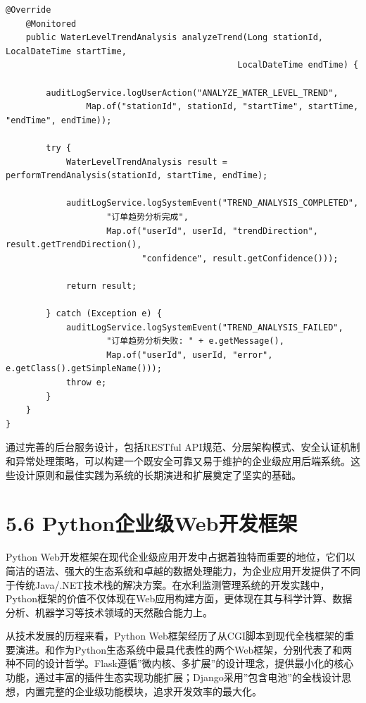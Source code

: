 \begin{lstlisting}[style=java]
    @Override
    @Monitored
    public WaterLevelTrendAnalysis analyzeTrend(Long stationId, LocalDateTime startTime, 
                                              LocalDateTime endTime) {
        
        auditLogService.logUserAction("ANALYZE_WATER_LEVEL_TREND", 
                Map.of("stationId", stationId, "startTime", startTime, "endTime", endTime));
        
        try {
            WaterLevelTrendAnalysis result = performTrendAnalysis(stationId, startTime, endTime);
            
            auditLogService.logSystemEvent("TREND_ANALYSIS_COMPLETED", 
                    "订单趋势分析完成", 
                    Map.of("userId", userId, "trendDirection", result.getTrendDirection(),
                           "confidence", result.getConfidence()));
            
            return result;
            
        } catch (Exception e) {
            auditLogService.logSystemEvent("TREND_ANALYSIS_FAILED", 
                    "订单趋势分析失败: " + e.getMessage(),
                    Map.of("userId", userId, "error", e.getClass().getSimpleName()));
            throw e;
        }
    }
}
\end{lstlisting}

通过完善的后台服务设计，包括RESTful API规范、分层架构模式、安全认证机制和异常处理策略，可以构建一个既安全可靠又易于维护的企业级应用后端系统。这些设计原则和最佳实践为系统的长期演进和扩展奠定了坚实的基础。

\hypertarget{pythonux4f01ux4e1aux7ea7webux5f00ux53d1ux6846ux67b6}{%
\section{5.6 Python企业级Web开发框架}\label{pythonux4f01ux4e1aux7ea7webux5f00ux53d1ux6846ux67b6}}

Python Web开发框架在现代企业级应用开发中占据着独特而重要的地位，它们以简洁的语法、强大的生态系统和卓越的数据处理能力，为企业应用开发提供了不同于传统Java/.NET技术栈的解决方案。在水利监测管理系统的开发实践中，Python框架的价值不仅体现在Web应用构建方面，更体现在其与科学计算、数据分析、机器学习等技术领域的天然融合能力上。

从技术发展的历程来看，Python Web框架经历了从CGI脚本到现代全栈框架的重要演进。和作为Python生态系统中最具代表性的两个Web框架，分别代表了和两种不同的设计哲学。Flask遵循''微内核、多扩展''的设计理念，提供最小化的核心功能，通过丰富的插件生态实现功能扩展；Django采用''包含电池''的全栈设计思想，内置完整的企业级功能模块，追求开发效率的最大化。

